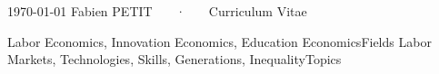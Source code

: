 \documentclass[11pt, letterpaper]{academic-cv}
\begin{document}
\makecvheader

\makecvfooter
  {\today}
  {Fabien PETIT ~~~·~~~ Curriculum Vitae}
  {\thepage}

\begin{cvhonors}
    \cvhonor
    {}{Labor Economics, Innovation Economics, Education Economics}{}{Fields} %
    \cvhonor
    {}{Labor Markets, Technologies, Skills, Generations, Inequality}{}{Topics} %
\end{cvhonors}

% 

% 










% 

% 
% 
% 
% 

\end{document}
